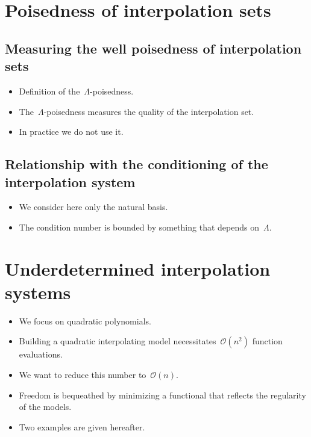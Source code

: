 \section{Poisedness of interpolation sets}
\label{sec:poisedness}

\subsection{Measuring the well poisedness of interpolation sets}

\begin{itemize}
    \item Definition of the~$\Lambda$-poisedness.
    \item The~$\Lambda$-poisedness measures the quality of the interpolation set.
    \item In practice we do not use it.
\end{itemize}

\subsection{Relationship with the conditioning of the interpolation system}

\begin{itemize}
    \item We consider here only the natural basis.
    \item The condition number is bounded by something that depends on~$\Lambda$.
\end{itemize}

\section{Underdetermined interpolation systems}
\label{sec:underdetermined-interpolation}

\begin{itemize}
    \item We focus on quadratic polynomials.
    \item Building a quadratic interpolating model necessitates~$\mathcal{O}(n^2)$ function evaluations.
    \item We want to reduce this number to~$\mathcal{O}(n)$.
    \item Freedom is bequeathed by minimizing a functional that reflects the regularity of the models.
    \item Two examples are given hereafter.
\end{itemize}

